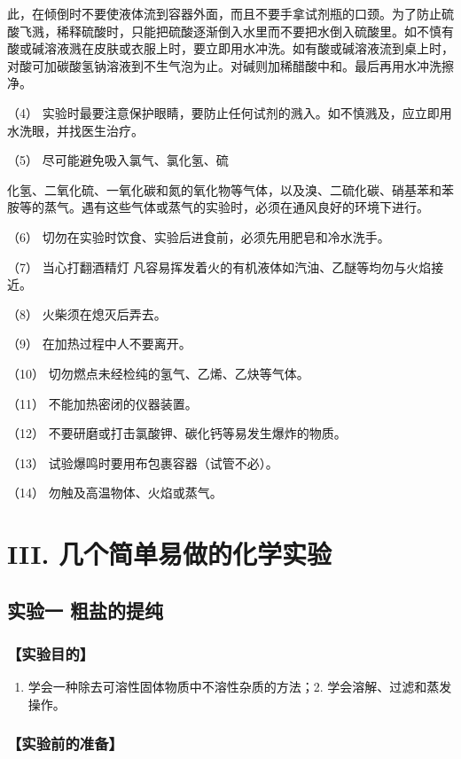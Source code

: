此，在倾倒时不要使液体流到容器外面，而且不要手拿试剂瓶的口颈。为了防止硫酸飞溅，稀释硫酸时，只能把硫酸逐渐倒入水里而不要把水倒入硫酸里。如不慎有酸或碱溶液溅在皮肤或衣服上时，要立即用水冲洗。如有酸或碱溶液流到桌上时，对酸可加碳酸氢钠溶液到不生气泡为止。对碱则加稀醋酸中和。最后再用水冲洗擦净。

（4）
实验时最要注意保护眼睛，要防止任何试剂的溅入。如不慎溅及，应立即用水洗眼，并找医生治疗。

（5） 尽可能避免吸入氯气、氯化氢、硫

化氢、二氧化硫、一氧化碳和氮的氧化物等气体，以及溴、二硫化碳、硝基苯和苯胺等的蒸气。遇有这些气体或蒸气的实验时，必须在通风良好的环境下进行。

（6） 切勿在实验时饮食、实验后进食前，必须先用肥皂和冷水洗手。

（7） 当心打翻酒精灯
凡容易挥发着火的有机液体如汽油、乙醚等均勿与火焰接近。

（8） 火柴须在熄灭后弄去。

（9） 在加热过程中人不要离开。

（10） 切勿燃点未经检纯的氢气、乙烯、乙炔等气体。

（11） 不能加热密闭的仪器装置。

（12） 不要研磨或打击氯酸钾、碳化钙等易发生爆炸的物质。

（13） 试验爆鸣时要用布包裹容器（试管不必）。

（14） 勿触及高温物体、火焰或蒸气。

\section{III. 几个简单易做的化学实验}\label{iii.-ux51e0ux4e2aux7b80ux5355ux6613ux505aux7684ux5316ux5b66ux5b9eux9a8c}

\subsection{实验一 粗盐的提纯}

\subsubsection{【实验目的】}

\begin{enumerate}
\item
  学会一种除去可溶性固体物质中不溶性杂质的方法；2.
  学会溶解、过滤和蒸发操作。
\end{enumerate}

\subsubsection{【实验前的准备】}

